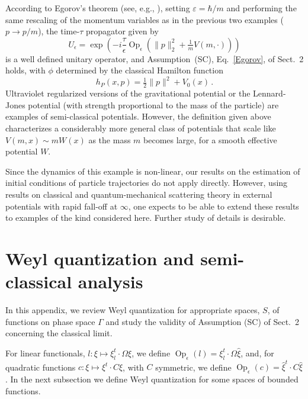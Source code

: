\documentclass[12pt]{article}
\DeclareMathOperator{\Op}{Op}
\begin{document}
According to Egorov's theorem (see, e.g., \cite[Theorem 1.2]{BR}), setting $\varepsilon=\hbar/m$ and performing 
the same rescaling of the momentum variables as in the previous two examples ($p\to p/m$), 
the time-$\tau$ propagator given by
$$U_\epsilon=\exp\left(-i \frac{\tau}{\epsilon}\operatorname{Op}_\epsilon\left(\| p \|_2^2+\tfrac1{m}V(m,\cdot)\right)\right)$$
is a well defined unitary operator, and Assumption~(SC), Eq.~\eqref{Egorov}, of Sect.~2 holds, with $\phi$ 
determined by the classical Hamilton function
$$h_{P}(x,p) = \tfrac12\|p\|^2+V_0(x)\,.$$
Ultraviolet regularized versions of the gravitational potential or the Lennard-Jones potential (with strength proportional 
to the mass of the particle) are examples of semi-classical potentials. However, the definition given above characterizes 
a considerably more general class of potentials that scale like $V(m,x)\sim mW(x)$ as the mass $m$ becomes large, for 
a smooth effective potential $W$. 

Since the dynamics of this example is non-linear, our results on the estimation of initial conditions of particle trajectories 
do not apply directly. However, using results on classical and quantum-mechanical scattering theory in 
external potentials with rapid fall-off at $\infty$, one expects to be able to extend these results to examples 
of the kind considered here. Further study of details is desirable.

\appendix

\section{Weyl quantization and semi-classical analysis}\label{app:semi-classical}
In this appendix, we review Weyl quantization for appropriate spaces, $S$, of functions on phase space $\Gamma$ 
and study the validity of Assumption (SC) of Sect.~2 concerning the classical limit.

For linear functionals, $l:\xi\mapsto \xi_l^{t}\cdot \Omega \xi$, we define $\Op_\epsilon(l)=\xi_l^{t}\cdot \Omega \hat \xi$, and, for quadratic functions 
$c:\xi\mapsto \xi^{t}\cdot C\xi$, with $C$ symmetric, we define $\Op_\epsilon(c)=\hat{\xi}^{t}\cdot C \hat\xi$.
In the next subsection we define Weyl quantization for some spaces of bounded functions.
\end{document}
